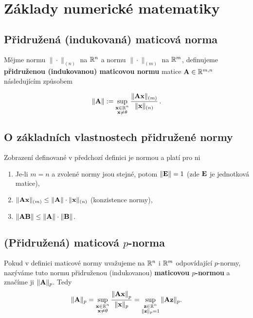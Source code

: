 \section{Základy numerické matematiky}

\subsection*{Přidružená (indukovaná) maticová norma}

Mějme normu $\| \cdot \|_{(n)}$ na $\mathbb{R}^n$ a normu $\| \cdot \|_{(m)}$ na $\mathbb{R}^m$, definujeme \textbf{přidruženou (indukovanou) maticovou normu} matice $\mathbf{A} \in \mathbb{R}^{m,n}$ následujícím způsobem

\begin{equation*}
	\| \mathbf{A}\| := \sup_{\substack{\mathbf{x} \in \mathbb{R}^{n} \\ \mathbf{x} \neq \theta}} \frac{ \|\mathbf{A}\mathbf{x}\|_{(m)} }{\|\mathbf{x}\|_{(n)}}\,.
\end{equation*}

\subsection*{O základních vlastnostech přidružené normy}

Zobrazení definované v předchozí definici je normou a platí pro ni

\begin{enumerate}
	\item Je-li $m=n$ a zvolené normy jsou stejné, potom $\|\mathbf{E}\| = 1$ (zde $\mathbf{E}$ je jednotková matice),
	\item $\|\mathbf{A}\mathbf{x}\|_{(m)} \leq \|\mathbf{A}\| \cdot \|\mathbf{x}\|_{(n)}$ (konzistence normy),
	\item $\|\mathbf{A}\mathbf{B}\| \leq \|\mathbf{A}\| \cdot \|\mathbf{B}\|$.
\end{enumerate}

\subsection*{(Přidružená) maticová $p$-norma}

Pokud v definici maticové normy uvažujeme na $\mathbb{R}^n$ i $\mathbb{R}^m$ odpovídající $p$-normy, nazýváme tuto normu přidruženou (indukovanou) \textbf{maticovou $p$-normou} a značíme ji $\|\mathbf{A}\|_p$. Tedy
\[\| \mathbf{A}\|_p = \sup_{\substack{\mathbf{x} \in \mathbb{R}^{n} \\ \mathbf{x} \neq \theta}}  \frac{\left\|\mathbf{A} \mathbf{x}\right\|_{p} }{\|\mathbf{x}\|_{p}}
= \sup_{\substack{\mathbf{z} \in \mathbb{R}^{n} \\ \|\mathbf{z}\|_{p} = 1}} \|\mathbf{A}\mathbf{z}\|_{p}.\]

